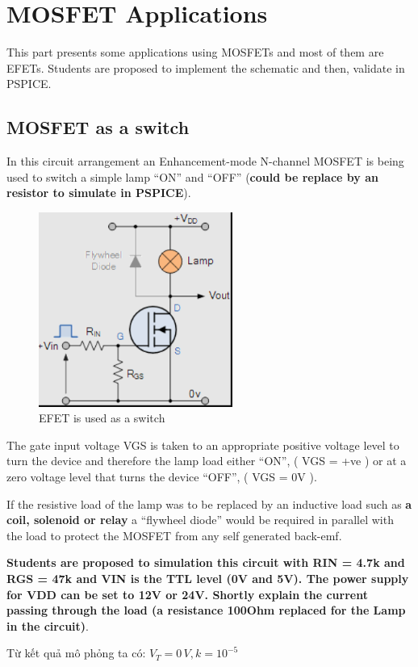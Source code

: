 \section{MOSFET Applications}
This part presents some applications using MOSFETs and most of them are EFETs. Students are proposed to implement the schematic and then, validate in PSPICE.
\subsection{MOSFET as a switch}
In this circuit arrangement an Enhancement-mode N-channel MOSFET is being used to switch a simple lamp “ON” and “OFF” (\textbf{could be replace by an resistor to simulate in PSPICE}).
\begin{figure}[!htp]
    \centering
    \includegraphics[width = 2.5in]{graphics/ex3/f1.png}
    \caption{EFET is used as a switch}
    \label{fet_app_1}
\end{figure}

The gate input voltage VGS is taken to an appropriate positive voltage level to turn the device and therefore the lamp load either “ON”, ( VGS = +ve ) or at a zero voltage level that turns the device “OFF”, ( VGS = 0V ).

If the resistive load of the lamp was to be replaced by an inductive load such as \textbf{a coil, solenoid or relay} a “flywheel diode” would be required in parallel with the load to protect the MOSFET from any self generated back-emf.

\textbf{Students are proposed to simulation this circuit with RIN = 4.7k and RGS = 47k and VIN is the TTL level (0V and 5V). The power supply for VDD can be set to 12V or 24V. Shortly explain the current passing through the load (a resistance 100Ohm replaced for the Lamp in the circuit)}.

Từ kết quả mô phỏng ta có: \( V_T = 0\, V, k = 10^{-5} \)

